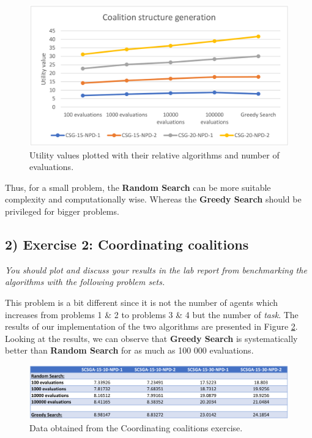 \documentclass[10pt]{article}
\begin{document}
 \begin{figure}[ht!]
 \includegraphics[width=\linewidth]{csg_graph.png}
 \caption{Utility values plotted with their relative algorithms and number of evaluations.}
 \label{fig:csg_graph}
 \end{figure}

 Thus, for a small problem, the \textbf{Random Search} can be more suitable complexity
  and computationally wise. Whereas the \textbf{Greedy Search} should be privileged for
  bigger problems.

\subsection*{2) \textbf{ Exercise 2: Coordinating coalitions}}
\textit {You should plot and discuss your results in the lab report from
 benchmarking the algorithms with the following problem sets.} \medskip

 This problem is a bit different since it is not the number of agents which increases from
  problems 1 \& 2 to problems 3 \& 4 but the number of \emph{task}. The results of our 
  implementation of the two algorithms are presented in Figure \ref{fig:scsga_data}.
  Looking at the results, we can observe that \textbf{Greedy Search} is systematically
  better than \textbf{Random Search} for as much as 100 000 evaluations.

 \begin{figure}[ht!]
 \includegraphics[width=\linewidth]{scsga_data.png}
 \caption{Data obtained from the Coordinating coalitions exercise.}
 \label{fig:scsga_data}
 \end{figure}
\end{document}
